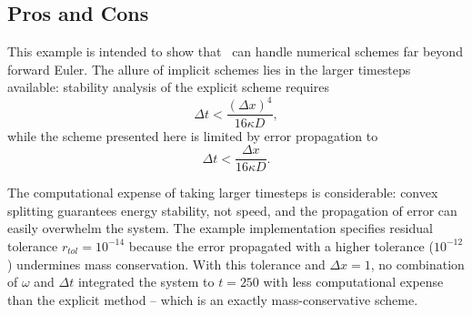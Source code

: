 	
	\subsection{Pros and Cons}
	This example is intended to show that \MMSP\ can handle numerical schemes far beyond forward Euler.
	The allure of implicit schemes lies in the larger timesteps available:
	stability analysis of the explicit scheme requires 
	\[\Delta t < \frac{(\Delta x)^4}{16\kappa D},\]
	while the scheme presented here is limited by error propagation to 
	\[\Delta t < \frac{\Delta x}{16\kappa D}.\]
	
	The computational expense of taking larger timesteps is considerable:
	convex splitting guarantees energy stability, not speed, and the propagation of error can easily overwhelm the
	system.
	The example implementation specifies residual tolerance $r_{tol}=10^{-14}$ because the error propagated with a higher tolerance
	($10^{-12}$) undermines mass conservation.
	With this tolerance and $\Delta x=1$, no combination of $\omega$ and $\Delta t$ integrated the system to $t=250$ with less computational
	expense than the explicit method -- which is an exactly mass-conservative scheme.
